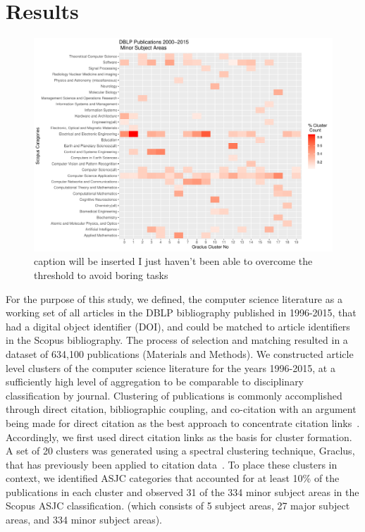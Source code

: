 \section{Results}
\label{sec:results}

\begin{figure}[ht]
  \includegraphics[scale=0.5]{scopus_dblp_graclus2.pdf}
\caption{caption will be inserted I just haven't been able to overcome the threshold to avoid boring tasks}
\label{heatmap}       %
\end{figure}
For the purpose of this study, we defined, the computer science literature as a working set of all articles in the DBLP bibliography published in 1996-2015, that had a digital object identifier (DOI), and could be matched to article identifiers in the Scopus bibliography. The process of selection and matching resulted in a dataset of 634,100 publications (Materials and Methods). We constructed article level clusters of the computer science literature for the years 1996-2015, at a sufficiently high level of aggregation to be comparable to disciplinary classification by journal. Clustering of publications is commonly accomplished through direct citation, bibliographic coupling, and co-citation with an argument being made for direct citation as the best approach to concentrate citation links~\cite{klavans_which_2017}. Accordingly, we first used direct citation links as the basis for cluster formation. A set of 20 clusters was generated using a spectral clustering technique, Graclus, that has previously been applied to citation data~\cite{graclus_2007,subelj_clustering_2016}. To place these clusters in context, we identified ASJC categories that accounted for at least 10\% of the publications in each cluster and observed 31 of the 334 minor subject areas in the Scopus ASJC classification. (which consists of 5 subject areas, 27 major subject areas, and 334 minor subject areas). 

